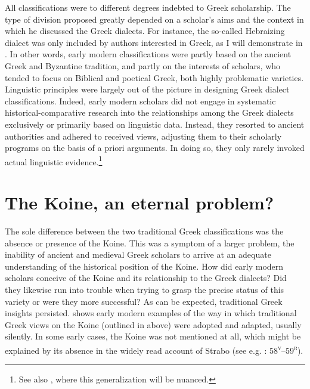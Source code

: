 All classifications were to different degrees indebted to Greek scholarship. The type of division proposed greatly depended on a scholar’s aims and the context in which he discussed the Greek dialects. For instance, the so-called Hebraizing dialect was only included by authors interested in  Greek, as I will demonstrate in . In other words, early modern classifications were partly based on the ancient Greek and Byzantine tradition, and partly on the interests of scholars, who tended to focus on Biblical and poetical Greek, both highly problematic varieties. Linguistic principles were largely out of the picture in designing Greek dialect classifications. Indeed, early modern scholars did not engage in systematic historical-comparative research into the relationships among the Greek dialects exclusively or primarily based on linguistic data. Instead, they resorted to ancient authorities and adhered to received views, adjusting them to their scholarly programs on the basis of a priori arguments. In doing so, they only rarely invoked actual linguistic evidence.\footnote{See also , where this generalization will be nuanced.}

\section{The Koine, an eternal problem?}\label{sec:2.9}

The sole difference between the two traditional Greek classifications was the absence or presence of the Koine. This was a symptom of a larger problem, the inability of ancient and medieval Greek scholars to arrive at an adequate understanding of the historical position of the Koine. How did early modern scholars conceive of the Koine and its relationship to the Greek dialects? Did they likewise run into trouble when trying to grasp the precise status of this variety or were they more successful? As can be expected, traditional Greek insights persisted.  shows early modern examples of the way in which traditional Greek views on the Koine (outlined in  above) were adopted and adapted, usually silently. In some early cases, the Koine was not mentioned at all, which might be explained by its absence in the widely read account of Strabo (see e.g. \citealt{Stapleton1566}: 58\textsc{\textsuperscript{v}}–59\textsc{\textsuperscript{r}}).

